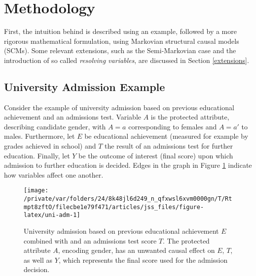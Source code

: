 \documentclass[
  nojss]{jss}
\begin{document}
\hypertarget{methodology}{%
\section{Methodology}\label{methodology}}

First, the intuition behind  is described using an
example, followed by a more rigorous mathematical formulation, using
Markovian structural causal models (SCMs). Some relevant extensions,
such as the Semi-Markovian case and the introduction of so called
\emph{resolving variables}, are discussed in Section \ref{extensions}.

\hypertarget{university-admission-example}{%
\subsection{University Admission
Example}\label{university-admission-example}}

Consider the example of university admission based on previous
educational achievement and an admissions test. Variable \(A\) is the
protected attribute, describing candidate gender, with \(A = a\)
corresponding to females and \(A = a'\) to males. Furthermore, let \(E\)
be educational achievement (measured for example by grades achieved in
school) and \(T\) the result of an admissions test for further
education. Finally, let \(Y\) be the outcome of interest (final score)
upon which admission to further education is decided. Edges in the graph
in Figure \ref{fig:uni-adm} indicate how variables affect one another.

\begin{CodeChunk}
\begin{figure}

{\centering \texttt{[image: /private/var/folders/24/8k48jl6d249\_n\_qfxwsl6xvm0000gn/T/Rtmpt8zftO/filecbe1e79f471/articles/jss\_files/figure-latex/uni-adm-1]} 

}

\caption[University admission based on previous educational achievement $E$ combined with and an admissions test score $T$]{University admission based on previous educational achievement $E$ combined with and an admissions test score $T$. The protected attribute $A$, encoding gender, has an unwanted causal effect on  $E$, $T$, as well as $Y$, which represents the final score used for the admission decision.}\label{fig:uni-adm}
\end{figure}
\end{CodeChunk}
\end{document}
